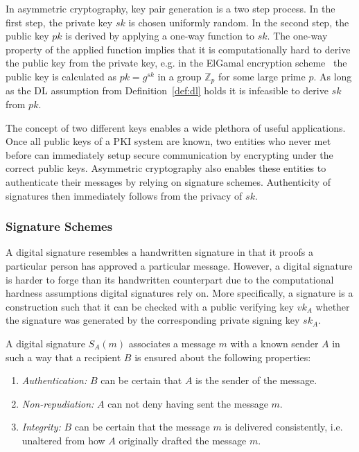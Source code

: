 In asymmetric cryptography, key pair generation is a two step process. In the first step, the private key $sk$ is chosen uniformly random. In the second step, the public key $pk$ is derived by applying a one-way function to $sk$. The one-way property of the applied function implies that it is computationally hard to derive the public key from the private key, e.g. in the ElGamal encryption scheme~\cite{art:Elgamal85} the public key is calculated as $pk = g^{sk}$ in a group $\mathbb{Z}_p$ for some large prime $p$. As long as the DL assumption from Definition~\ref{def:dl} holds it is infeasible to derive $sk$ from $pk$.

The concept of two different keys enables a wide plethora of useful applications. Once all public keys of a PKI system are known, two entities who never met before can immediately setup secure communication by encrypting under the correct public keys. Asymmetric cryptography also enables these entities to authenticate their messages by relying on signature schemes. Authenticity of signatures then immediately follows from the privacy of $sk$.

\subsubsection{Signature Schemes}
A digital signature resembles a handwritten signature in that it proofs a particular person has approved a particular message. However, a digital signature is harder to forge than its handwritten counterpart due to the computational hardness assumptions digital signatures rely on. More specifically, a signature is a construction such that it can be checked with a public verifying key $vk_A$ whether the signature was generated by the corresponding private signing key $sk_A$.

\begin{defn}
\label{def:digital_signature}
 A digital signature $S_A \left( m \right)$ associates a message $m$ with a known sender $A$ in such a way that a recipient $B$ is ensured about the following properties:
 \begin{enumerate}
  \item \textit{Authentication:} $B$ can be certain that $A$ is the sender of the message.
  \item \textit{Non-repudiation:} $A$ can not deny having sent the message $m$.
  \item \textit{Integrity:} $B$ can be certain that the message $m$ is delivered consistently, i.e. unaltered from how $A$ originally drafted the message $m$.
 \end{enumerate}
\end{defn}

